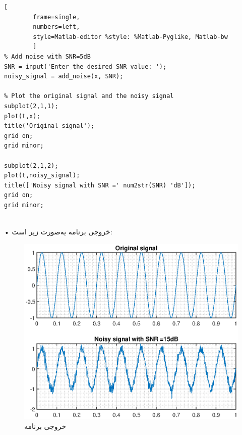 \documentclass[12pt]{exam}
\begin{document}
\begin{questions}
\begin{latin}
\begin{lstlisting}[
		frame=single,
		numbers=left,
		style=Matlab-editor %style: %Matlab-Pyglike, Matlab-bw
		]
% Add noise with SNR=5dB
SNR = input('Enter the desired SNR value: ');
noisy_signal = add_noise(x, SNR);

% Plot the original signal and the noisy signal
subplot(2,1,1);
plot(t,x);
title('Original signal');
grid on;
grid minor;

subplot(2,1,2);
plot(t,noisy_signal);
title(['Noisy signal with SNR =' num2str(SNR) 'dB']);
grid on;
grid minor;
		
\end{lstlisting}
\end{latin}

• خروجی برنامه یه‌صورت زیر است: 
\begin{figure}[h]
	\centering
	\includegraphics[width=1\textwidth]{images/Result}
	\caption{خروجی برنامه}
\end{figure}


\end{questions}
\end{document}
